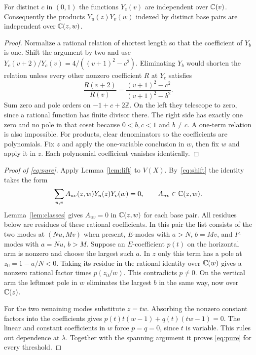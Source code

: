 \begin{lemma}\label{lem:classes}
For distinct $c$ in $(0,1)$ the functions $Y_c(v)$ are independent over $\mathbb C(v)$. Consequently the products $Y_u(z)Y_v(w)$ indexed by distinct base pairs are independent over $\mathbb C(z,w)$.
\end{lemma}
\begin{proof}
Normalize a rational relation of shortest length so that the coefficient of $Y_b$ is one. Shift the argument by two and use $Y_c(v+2)/Y_c(v)=4/((v+1)^2-c^2)$. Eliminating $Y_b$ would shorten the relation unless every other nonzero coefficient $R$ at $Y_c$ satisfies
\[
 \frac{R(v+2)}{R(v)}=\frac{(v+1)^2-c^2}{(v+1)^2-b^2}.
\]
Sum zero and pole orders on $-1+c+2\mathbb Z$. On the left they telescope to zero, since a rational function has finite divisor there. The right side has exactly one zero and no pole in that coset because $0<b,c<1$ and $b\ne c$. A one-term relation is also impossible. For products, clear denominators so the coefficients are polynomials. Fix $z$ and apply the one-variable conclusion in $w$, then fix $w$ and apply it in $z$. Each polynomial coefficient vanishes identically.
\end{proof}

\begin{proof}[Proof of \eqref{eq:pure}]
Apply Lemma~\ref{lem:lift} to $V(X)$. By~\eqref{eq:shift} the identity takes the form
\[
 \sum_{u,v} A_{uv}(z,w)Y_u(z)Y_v(w)=0,\qquad A_{uv}\in\mathbb C(z,w).
\] Lemma~\ref{lem:classes} gives \(A_{uv}=0\) in \(\mathbb C(z,w)\) for each base pair. All residues below are residues of these rational coefficients. In this pair the list consists of the two modes at $(Nu,Mv)$ when present, $E$-modes with $a>N$, $b=Mv$, and $F$-modes with $a=Nu$, $b>M$. Suppose an $E$-coefficient $p(t)$ on the horizontal arm is nonzero and choose the largest such $a$. In $z$ only this term has a pole at $z_0=1-a/N<0$. Taking its residue in the rational identity over $\mathbb C(w)$ gives a nonzero rational factor times $p(z_0/w)$. This contradicts $p\ne0$. On the vertical arm the leftmost pole in $w$ eliminates the largest $b$ in the same way, now over $\mathbb C(z)$.

For the two remaining modes substitute $z=tw$. Absorbing the nonzero constant factors into the coefficients gives $p(t)t(w-1)+q(t)(tw-1)=0$. The linear and constant coefficients in $w$ force $p=q=0$, since $t$ is variable. This rules out dependence at $\lambda$. Together with the spanning argument it proves \eqref{eq:pure} for every threshold.
\end{proof}
